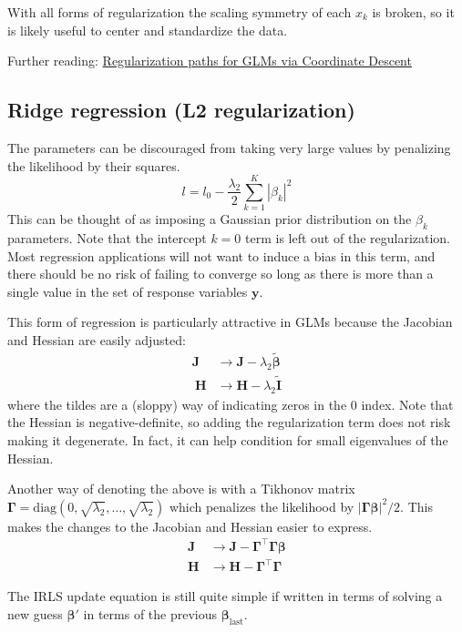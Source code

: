 \documentclass{article}
\newcommand{\bbeta}{\boldsymbol{\beta}}
\begin{document}
With all forms of regularization the scaling symmetry of each \(x_k\) is
broken, so it is likely useful to center and standardize the data.

Further reading: \href{https://doi.org/10.18637/jss.v033.i01}{Regularization
paths for GLMs via Coordinate Descent}

\subsection{Ridge regression (L2 regularization)}

The parameters can be discouraged from taking very large values by penalizing
the likelihood by their squares.
\[ l = l_0 - \frac{\lambda_2}{2} \sum_{k=1}^K \left| \beta_{k} \right|^2 \]
This can be thought of as imposing a Gaussian prior distribution on the
\(\beta_k\) parameters. Note that the intercept \(k=0\) term is left out of
the regularization. Most regression applications will not want to induce a bias
in this term, and there should be no risk of failing to converge so long as
there is more than a single value in the set of response variables
\(\mathbf{y}\).

This form of regression is particularly attractive in GLMs because the Jacobian
and Hessian are easily adjusted:
\begin{align}
\mathbf{J} &\rightarrow \mathbf{J} - \lambda_2 \tilde{\bbeta} \\\
\mathbf{H} &\rightarrow \mathbf{H} - \lambda_2 \tilde{\mathbf{I}}
\end{align}
where the tildes are a (sloppy) way of indicating zeros in the \(0\) index.
Note that the Hessian is negative-definite, so adding the regularization term
does not risk making it degenerate. In fact, it can help condition for small
eigenvalues of the Hessian.

Another way of denoting the above is with a Tikhonov matrix
\(\boldsymbol{\Gamma} = \textrm{diag}(0, \sqrt{\lambda_2}, \ldots,
\sqrt{\lambda_2})\) which penalizes the likelihood by
\(\left|\boldsymbol{\Gamma}\bbeta\right|^2/2\). This makes the
changes to the Jacobian and Hessian easier to express.
\begin{align}
\mathbf{J} &\rightarrow \mathbf{J} - \boldsymbol{\Gamma}^\intercal\boldsymbol{\Gamma}\bbeta \\
\mathbf{H} &\rightarrow \mathbf{H} - \boldsymbol{\Gamma}^\intercal\boldsymbol{\Gamma}
\end{align}

The IRLS update equation is still quite simple if written in terms of solving a
new guess \( \bbeta' \) in terms of the previous
\(\bbeta_\textrm{last}\).
\end{document}
